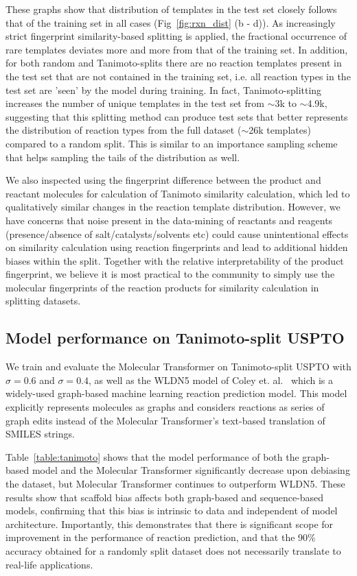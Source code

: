 These graphs show that distribution of templates in the test set closely follows that of the training set in all cases (Fig~\ref{fig:rxn_dist} (b - d)). As increasingly strict fingerprint similarity-based splitting is applied, the fractional occurrence of rare templates deviates more and more from that of the training set. In addition, for both random and Tanimoto-splits there are no reaction templates present in the test set that are not contained in the training set, i.e. all reaction types in the test set are 'seen' by the model during training. In fact, Tanimoto-splitting increases the number of unique templates in the test set from $\sim$3k to $\sim$4.9k, suggesting that this splitting method can produce test sets that better represents the distribution of reaction types from the full dataset ($\sim$26k templates) compared to a random split. This is similar to an importance sampling scheme that helps sampling the tails of the distribution as well.

We also inspected using the fingerprint difference between the product and reactant molecules for calculation of Tanimoto similarity calculation, which led to qualitatively similar changes in the reaction template distribution. However, we have concerns that noise present in the data-mining of reactants and reagents (presence/absence of salt/catalysts/solvents etc) could cause unintentional effects on similarity calculation using reaction fingerprints and lead to additional hidden biases within the split. Together with the relative interpretability of the product fingerprint, we believe it is most practical to the community to simply use the molecular fingerprints of the reaction products for similarity calculation in splitting datasets.

\subsection{Model performance on Tanimoto-split USPTO}
We train and evaluate the Molecular Transformer on Tanimoto-split USPTO with $\sigma = 0.6$ and $\sigma = 0.4$, as well as the WLDN5 model of Coley et. al.~\cite{Coley19WLDN5} which is a widely-used graph-based machine learning reaction prediction model. This model explicitly represents molecules as graphs and considers reactions as series of graph edits instead of the Molecular Transformer's text-based translation of SMILES strings.

Table~\ref{table:tanimoto} shows that the model performance of both the graph-based model and the Molecular Transformer significantly decrease upon debiasing the dataset, but Molecular Transformer continues to outperform WLDN5.  These results show that scaffold bias affects both graph-based and sequence-based models, confirming that this bias is intrinsic to data and independent of model architecture. Importantly, this demonstrates that there is significant scope for improvement in the performance of reaction prediction, and that the 90\% accuracy obtained for a randomly split dataset does not necessarily translate to real-life applications.

